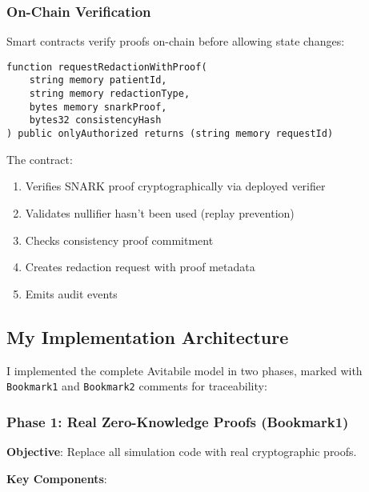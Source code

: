 \subsubsection{On-Chain Verification}

Smart contracts verify proofs on-chain before allowing state changes:

\begin{verbatim}
function requestRedactionWithProof(
    string memory patientId,
    string memory redactionType,
    bytes memory snarkProof,
    bytes32 consistencyHash
) public onlyAuthorized returns (string memory requestId)
\end{verbatim}

The contract:
\begin{enumerate}
    \item Verifies SNARK proof cryptographically via deployed verifier
    \item Validates nullifier hasn't been used (replay prevention)
    \item Checks consistency proof commitment
    \item Creates redaction request with proof metadata
    \item Emits audit events
\end{enumerate}

\subsection{My Implementation Architecture}

I implemented the complete Avitabile model in two phases, marked with \texttt{Bookmark1} and \texttt{Bookmark2} comments for traceability:

\subsubsection{Phase 1: Real Zero-Knowledge Proofs (Bookmark1)}

\textbf{Objective}: Replace all simulation code with real cryptographic proofs.

\textbf{Key Components}:

